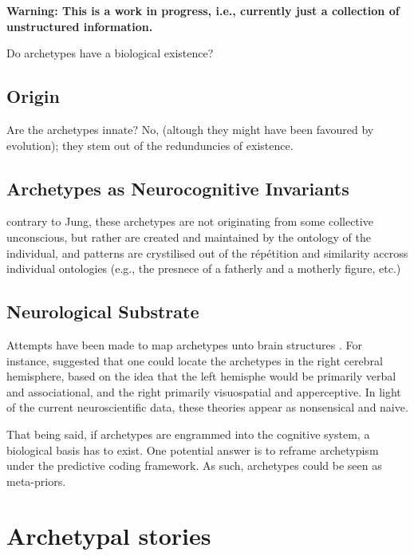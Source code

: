 \documentclass[]{book}
\begin{document}
\textbf{Warning: This is a work in progress, i.e., currently just a collection of unstructured information.}

Do archetypes have a biological existence?

\hypertarget{origin}{%
\section{Origin}\label{origin}}

Are the archetypes innate? No, (altough they might have been favoured by evolution); they stem out of the redunduncies of existence.

\hypertarget{archetypes-as-neurocognitive-invariants}{%
\section{Archetypes as Neurocognitive Invariants}\label{archetypes-as-neurocognitive-invariants}}

contrary to Jung, these archetypes are not originating from some collective unconscious, but rather are created and maintained by the ontology of the individual, and patterns are crystilised out of the répétition and similarity accross individual ontologies (e.g., the presnece of a fatherly and a motherly figure, etc.)

\hypertarget{neurological-substrate}{%
\section{Neurological Substrate}\label{neurological-substrate}}

Attempts have been made to map archetypes unto brain structures \citep{samuels2003jung}. For instance, \citet{rossi1977cerebral} suggested that one could locate the archetypes in the right cerebral hemisphere, based on the idea that the left hemisphe would be primarily verbal and associational, and the right primarily visuospatial and apperceptive. In light of the current neuroscientific data, these theories appear as nonsensical and naive.

That being said, if archetypes are engrammed into the cognitive system, a biological basis has to exist. One potential answer is to reframe archetypism under the predictive coding framework. As such, archetypes could be seen as meta-priors.

\hypertarget{archetypal-stories}{%
\chapter{Archetypal stories}\label{archetypal-stories}}
\end{document}
